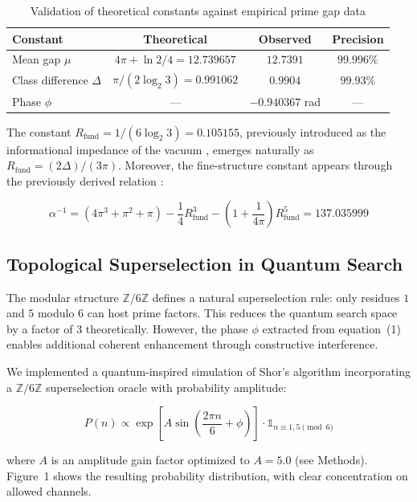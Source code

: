 \documentclass[pdflatex,sn-nature]{sn-jnl}
\theoremstyle{thmstyleone}
\theoremstyle{thmstyletwo}
\theoremstyle{thmstylethree}
\newcommand{\Zmod}{\mathbb{Z}/6\mathbb{Z}}
\newcommand{\Rfund}{R_{\text{fund}}}
\begin{document}
\begin{table}[h]
\caption{Validation of theoretical constants against empirical prime gap data}
\label{tab:validation}
\begin{tabular}{lccc}
\toprule
\textbf{Constant} & \textbf{Theoretical} & \textbf{Observed} & \textbf{Precision} \\
\midrule
Mean gap $\mu$ & $4\pi + \ln 2/4 = 12.739657$ & $12.7391$ & $99.996\%$ \\
Class difference $\Delta$ & $\pi/(2\log_2 3) = 0.991062$ & $0.9904$ & $99.93\%$ \\
Phase $\phi$ & — & $-0.940367$ rad & — \\
\bottomrule
\end{tabular}
\end{table}

The constant $\Rfund = 1/(6\log_2 3) = 0.105155$, previously introduced as the informational impedance of the vacuum \cite{PeinadorGenesis}, emerges naturally as $\Rfund = (2\Delta)/(3\pi)$. Moreover, the fine-structure constant appears through the previously derived relation \cite{PeinadorGenesis}:

\begin{equation}
\alpha^{-1} = (4\pi^3 + \pi^2 + \pi) - \frac{1}{4}\Rfund^3 - \left(1+\frac{1}{4\pi}\right)\Rfund^5 = 137.035999
\label{eq:alpha}
\end{equation}

\subsection*{Topological Superselection in Quantum Search}

The modular structure $\Zmod$ defines a natural superselection rule: only residues $1$ and $5$ modulo $6$ can host prime factors. This reduces the quantum search space by a factor of $3$ theoretically. However, the phase $\phi$ extracted from equation~(1) enables additional coherent enhancement through constructive interference.

We implemented a quantum-inspired simulation of Shor's algorithm incorporating a $\Zmod$ superselection oracle with probability amplitude:

\begin{equation}
P(n) \propto \exp\left[A\sin\left(\frac{2\pi n}{6} + \phi\right)\right]\cdot \mathbb{1}_{n\equiv 1,5\pmod{6}}
\label{eq:quantum}
\end{equation}

where $A$ is an amplitude gain factor optimized to $A=5.0$ (see Methods). Figure~1 shows the resulting probability distribution, with clear concentration on allowed channels.
\end{document}
